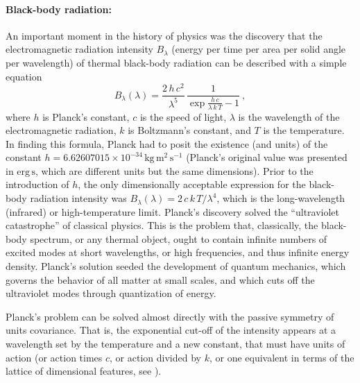 \documentclass[preprint]{article} %
\newcommand{\unit}[1]{\mathrm{#1}}
\newcommand{\kg}{\unit{kg}}
\newcommand{\m}{\unit{m}}
\newcommand{\s}{\unit{s}}
\begin{document}
\paragraph{Black-body radiation:}
An important moment in the history of physics was the discovery that the electromagnetic radiation intensity $B_\lambda$ (energy per time per area per solid angle per wavelength) of thermal black-body radiation can be described with a simple equation \citep{planck}
\begin{equation} \label{eq.planck}
    B_\lambda(\lambda) = \frac{2\,h\,c^2}{\lambda^5}\,\frac{1}{\exp\frac{h\,c}{\lambda\,k\,T} - 1}~,
\end{equation}
where $h$ is Planck's constant,
$c$ is the speed of light,
$\lambda$ is the wavelength of the electromagnetic radiation,
$k$ is Boltzmann's constant,
and $T$ is the temperature.
In finding this formula, Planck had to posit the existence (and units) of the constant $h=6.62607015\times 10^{-34}\,\kg\,\m^2\,\s^{-1}$ (Planck's original value was presented in $\mathrm{erg}\,\s$, which are different units but the same dimensions).
Prior to the introduction of $h$, the only dimensionally acceptable expression for the black-body radiation intensity was $B_\lambda(\lambda)=2\,c\,k\,T/\lambda^4$, which is the long-wavelength (infrared) or high-temperature limit.
Planck's discovery solved the ``ultraviolet catastrophe'' of classical physics.
This is the problem that, classically, the black-body spectrum, or any thermal object, ought to contain infinite numbers of excited modes at short wavelengths, or high frequencies, and thus infinite energy density.
Planck's solution seeded the development of quantum mechanics, which governs the behavior of all matter at small scales, and which cuts off the ultraviolet modes through quantization of energy.

Planck's problem can be solved almost directly with the passive symmetry of units covariance.
That is, the exponential cut-off of the intensity appears at a wavelength set by the temperature and a new constant, that must have units of action (or action times $c$, or action divided by $k$, or one equivalent in terms of the lattice of dimensional features, see \citealt{villar2022dimensionless}).
\end{document}
